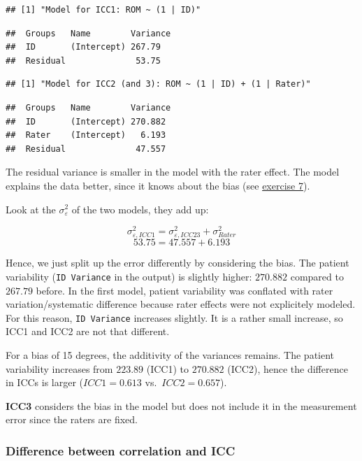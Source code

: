 \documentclass[
]{article}
\begin{document}
\begin{verbatim}
## [1] "Model for ICC1: ROM ~ (1 | ID)"
\end{verbatim}

\begin{verbatim}
##  Groups   Name        Variance
##  ID       (Intercept) 267.79  
##  Residual              53.75
\end{verbatim}

\begin{verbatim}
## [1] "Model for ICC2 (and 3): ROM ~ (1 | ID) + (1 | Rater)"
\end{verbatim}

\begin{verbatim}
##  Groups   Name        Variance
##  ID       (Intercept) 270.882 
##  Rater    (Intercept)   6.193 
##  Residual              47.557
\end{verbatim}

The residual variance is smaller in the model with the rater effect.
The model explains the data better, since it knows about the bias (see \hyperref[excercise7]{exercise 7}).

Look at the \(\sigma_{\varepsilon}^2\) of the two models, they add up:

\[\sigma_{\varepsilon, ICC1}^2 = \sigma_{\varepsilon, ICC23}^2 + \sigma_{Rater}^2\]
\[53.75 = 47.557 + 6.193\]

Hence, we just split up the error differently by considering the bias.
The patient variability (\texttt{ID\ Variance} in the output) is slightly higher:
\(270.882\) compared to \(267.79\) before.
In the first model, patient variability was conflated with rater variation/systematic difference
because rater effects were not explicitely modeled. For this reason,
\texttt{ID\ Variance} increases slightly.
It is a rather small increase, so ICC1 and ICC2 are not that different.

For a bias of 15 degrees, the additivity of the variances remains.
The patient variability increases from \(223.89\) (ICC1) to \(270.882\) (ICC2),
hence the difference in ICCs is larger (\(ICC1=0.613\) vs.~\(ICC2=0.657\)).

\textbf{ICC3} considers the bias in the model but does not include it in the measurement
error since the raters are fixed.

\subsubsection{Difference between correlation and ICC}\label{difference-between-correlation-and-icc}
\end{document}
